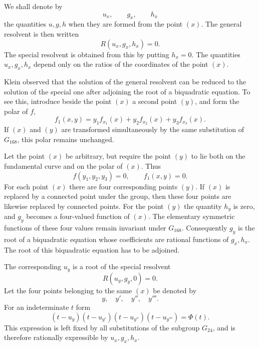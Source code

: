 \documentclass[12pt,a4paper]{article}
\begin{document}
We shall denote by
\[
 u_x,
\qquad g_x,
\qquad h_x
\]
the quantities \(u,g,h\) when they are formed from the point \((x)\).  The general resolvent is then written
\begin{equation}
 R(u_x,g_x,h_x)=0. \tag{1}
\end{equation}
The special resolvent is obtained from this by putting \(h_x=0\).  The quantities \(u_x,g_x,h_x\) depend only on the ratios of the coordinates of the point \((x)\).

Klein observed that the solution of the general resolvent can be reduced to the solution of the special one after adjoining the root of a biquadratic equation.  To see this, introduce beside the point \((x)\) a second point \((y)\), and form the polar of \(f\),
\begin{equation}
 f_1(x,y)=y_1f_{x_1}(x)+y_2f_{x_2}(x)+y_3f_{x_3}(x). \tag{2}
\end{equation}
If \((x)\) and \((y)\) are transformed simultaneously by the same substitution of \(G_{168}\), this polar remains unchanged.

Let the point \((x)\) be arbitrary, but require the point \((y)\) to lie both on the fundamental curve and on the polar of \((x)\).  Thus
\begin{equation}
 f(y_1,y_2,y_3)=0,
\qquad f_1(x,y)=0. \tag{3}
\end{equation}
For each point \((x)\) there are four corresponding points \((y)\).  If \((x)\) is replaced by a connected point under the group, then these four points are likewise replaced by connected points.  For the point \((y)\) the quantity \(h_y\) is zero, and \(g_y\) becomes a four-valued function of \((x)\).  The elementary symmetric functions of these four values remain invariant under \(G_{168}\).  Consequently \(g_y\) is the root of a biquadratic equation whose coefficients are rational functions of \(g_x,h_x\).  The root of this biquadratic equation has to be adjoined.

The corresponding \(u_y\) is a root of the special resolvent
\begin{equation}
 R(u_y,g_y,0)=0. \tag{4}
\end{equation}
Let the four points belonging to the same \((x)\) be denoted by
\[
 y,
\quad y',
\quad y'',
\quad y'''.
\]
For an indeterminate \(t\) form
\begin{equation}
 (t-u_y)(t-u_{y'})(t-u_{y''})(t-u_{y'''})=\Phi(t). \tag{5}
\end{equation}
This expression is left fixed by all substitutions of the subgroup \(G_{24}\), and is therefore rationally expressible by \(u_x,g_x,h_x\).
\end{document}
